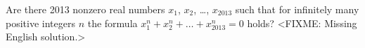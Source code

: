 \problem{}
Are there 2013 nonzero real numbers
$x_1$, $x_2$, \ldots, $x_{2013}$ such
that for infinitely many positive integers $n$ the formula $x_1 ^ n + x_2 ^ n + \ldots + x_ {2013} ^ n = 0$ holds?
\solution
<FIXME: Missing English solution.>
\endproblem

